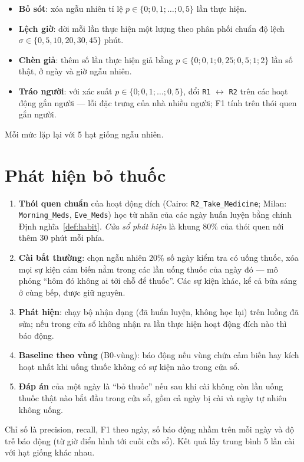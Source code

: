 \begin{itemize}
  \item \textbf{Bỏ sót}: xóa ngẫu nhiên tỉ lệ $p \in \{0; 0{,}1; \dots; 0{,}5\}$ lần thực hiện.
  \item \textbf{Lệch giờ}: dời mỗi lần thực hiện một lượng theo phân phối chuẩn độ lệch
  $\sigma \in \{0, 5, 10, 20, 30, 45\}$ phút.
  \item \textbf{Chèn giả}: thêm số lần thực hiện giả bằng $p \in \{0; 0{,}1; 0{,}25; 0{,}5; 1; 2\}$ lần
  số thật, ở ngày và giờ ngẫu nhiên.
  \item \textbf{Tráo người}: với xác suất $p \in \{0; 0{,}1; \dots; 0{,}5\}$, đổi \texttt{R1} $\leftrightarrow$
  \texttt{R2} trên các hoạt động gắn người --- lỗi đặc trưng của nhà nhiều người; F1 tính trên thói quen
  gắn người.
\end{itemize}
Mỗi mức lặp lại với 5 hạt giống ngẫu nhiên.

\section{Phát hiện bỏ thuốc}
\label{sec:m-rq3}

\begin{enumerate}
  \item \textbf{Thói quen chuẩn} của hoạt động đích (Cairo: \texttt{R2\_Take\_Medicine}; Milan:
  \texttt{Morning\_Meds}, \texttt{Eve\_Meds}) học từ nhãn của các ngày huấn luyện bằng chính
  Định nghĩa~\ref{def:habit}. \emph{Cửa sổ phát hiện} là khung 80\% của thói quen nới thêm 30 phút mỗi phía.
  \item \textbf{Cài bất thường}: chọn ngẫu nhiên 20\% số ngày kiểm tra có uống thuốc, xóa mọi sự kiện cảm
  biến nằm trong các lần uống thuốc của ngày đó --- mô phỏng ``hôm đó không ai tới chỗ để thuốc''. Các sự
  kiện khác, kể cả bữa sáng ở cùng bếp, được giữ nguyên.
  \item \textbf{Phát hiện}: chạy bộ nhận dạng (đã huấn luyện, không học lại) trên luồng đã sửa; nếu
  trong cửa sổ không nhận ra lần thực hiện hoạt động đích nào thì báo động.
  \item \textbf{Baseline theo vùng} (B0-vùng): báo động nếu vùng chứa cảm biến hay kích hoạt nhất khi uống
  thuốc không có sự kiện nào trong cửa sổ.
  \item \textbf{Đáp án} của một ngày là ``bỏ thuốc'' nếu sau khi cài không còn lần uống thuốc thật nào bắt
  đầu trong cửa sổ, gồm cả ngày bị cài và ngày tự nhiên không uống.
\end{enumerate}
Chỉ số là precision, recall, F1 theo ngày, số báo động nhầm trên mỗi ngày và độ trễ báo động (từ giờ điển
hình tới cuối cửa sổ). Kết quả lấy trung bình 5 lần cài với hạt giống khác nhau.
